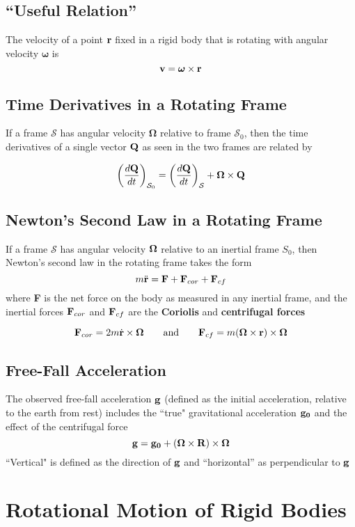 \documentclass{article}
\begin{document}
\subsection*{``Useful Relation''}
The velocity of a point $\vb{r}$ fixed in a rigid body that is rotating with angular velocity $\bm{\omega}$ is 
$$
\vb{v} = \bm{\omega} \times \vb{r}
$$

\subsection*{Time Derivatives in a Rotating Frame}
If a frame $\mathcal{S}$ has angular velocity $\bm{\Omega}$ relative to frame $\mathcal{S}_0$, then the time derivatives of a single vector $\vb{Q}$ as seen in the two frames are related by

$$
\left( \frac{d\vb{Q}}{dt} \right)_{\mathcal{S}_0} = \left( \frac{d\vb{Q}}{dt} \right)_{\mathcal{S}} + \vb{\Omega} \times \vb{Q}
$$

\subsection*{Newton's Second Law in a Rotating Frame}
If a frame $\mathcal{S}$ has angular velocity $\vb{\Omega}$ relative to an inertial frame $S_{0}$, then Newton's second law in the rotating frame takes the form
$$
m\ddot{\vb{r}} = \vb{F} + \vb{F}_{cor} + \vb{F}_{cf}
$$
where \textbf{F} is the net force on the body as measured in any inertial frame, and the inertial forces $\vb{F}_{cor}$ and $\vb{F}_{cf}$ are the \textbf{Coriolis} and \textbf{centrifugal forces}

$$
\vb{F}_{cor} = 2m\dot{\vb{r}} \times \vb{\Omega} \qquad \text{and} \qquad \vb{F}_{cf} = m(\vb{\Omega} \times \vb{r}) \times \vb{\Omega}
$$

\subsection*{Free-Fall Acceleration}
The observed free-fall acceleration $\vb{g}$ (defined as the initial acceleration, relative to the earth from rest) includes the ``true" gravitational acceleration $\vb{g_0}$ and the effect of the centrifugal force
$$
\vb{g} = \vb{g_0} + (\vb{\Omega} \times \vb{R}) \times \vb{\Omega}
$$
``Vertical" is defined as the direction of $\vb{g}$ and ``horizontal'' as perpendicular to $\vb{g}$
\section{Rotational Motion of Rigid Bodies}
\end{document}
